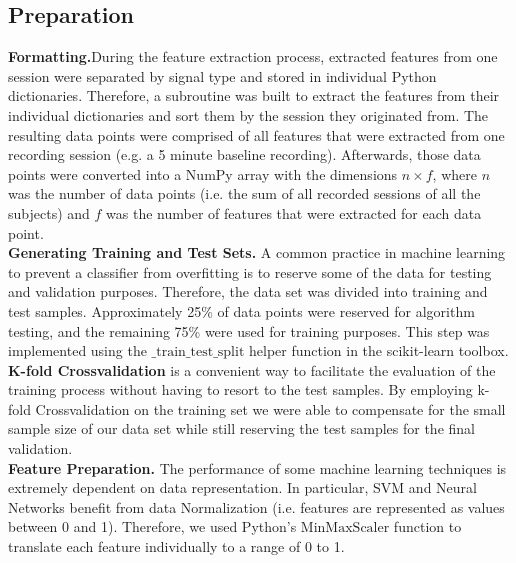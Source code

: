 \subsection{Preparation} 
\textbf{Formatting.}During the feature extraction process, extracted features from one session were separated by signal type and stored in individual Python dictionaries. Therefore, a subroutine was built to extract the features from their individual dictionaries and sort them by the session they originated from. The resulting data points were comprised of all features that were extracted from one recording session (e.g. a 5 minute baseline recording).
Afterwards, those data points were converted into a NumPy array with the dimensions $n \times f$, where $n$ was the number of data points (i.e. the sum of all recorded sessions of all the subjects) and $f$ was the number of features that were extracted for each data point.\\
\textbf{Generating Training and Test Sets.} A common practice in machine learning to prevent a classifier from overfitting is to reserve some of the data for testing and validation purposes. Therefore, the data set was divided into training and test samples. Approximately 25\% of data points were reserved for algorithm testing, and the remaining 75\% were used for training purposes. This step was implemented using the $\text{\_train\_test\_split}$ helper function in the scikit-learn toolbox.\\
\textbf{K-fold Crossvalidation} is a convenient way to facilitate the evaluation of the training process without having to resort to the test samples. By employing k-fold Crossvalidation on the training set we were able to compensate for the small sample size of our data set while still reserving the test samples for the final validation.\\
\textbf{Feature Preparation.} The performance of some machine learning techniques is extremely dependent on data representation. In particular, SVM and Neural Networks benefit from data Normalization (i.e. features are represented as values between 0 and 1). Therefore, we used Python's $\text{MinMaxScaler}$ function to translate each feature individually to a range of 0 to 1.\\

\newpage
